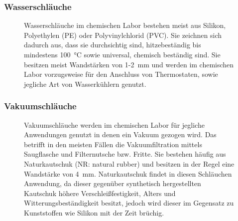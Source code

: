 \subsubsection*{Wasserschläuche}
\begin{figure}[h!]
	\begin{minipage}[t]{0.63\textwidth}
		\vspace{0pt}
		Wasserschläuche im chemischen Labor bestehen meist aus Silikon, Polyethylen (PE) oder Polyvinylchlorid (PVC). Sie zeichnen sich dadurch aus, dass sie durchsichtig sind, hitzebeständig bis mindestens \SI{100}{\celsius} sowie universal, chemisch beständig sind. 
		Sie besitzen meist Wandstärken von 1-\SI{2}{\milli \meter} und werden im chemischen Labor vorzugsweise für den Anschluss von Thermostaten, sowie jegliche Art von Wasserkühlern genutzt.
	\end{minipage}
	\hfill
	\hspace{1mm}
	\begin{minipage}[t]{0.35\textwidth}
	\end{minipage}
\end{figure}
\FloatBarrier
\vspace{-7mm}
\subsubsection*{Vakuumschläuche}
 \begin{figure}[h!]
	\begin{minipage}[t]{0.35\textwidth}
	\end{minipage}
	\hfill
	\hspace{2mm}
	\begin{minipage}[t]{0.65\textwidth}
		\vspace{0pt}
		Vakuumschläuche werden im chemischen Labor für jegliche Anwendungen genutzt in denen ein Vakuum gezogen wird. Das betrifft in den meisten Fällen die Vakuumfiltration mittels Saugflasche und Filternutsche bzw. Fritte. Sie bestehen häufig aus Naturkautschuk (NR: natural rubber) und besitzen in der Regel eine Wandstärke von \SI{4}{\milli \meter}. Naturkautschuk findet in diesen Schläuchen Anwendung, da dieser gegenüber synthetisch hergestellten Kautschuk höhere Verschleißfestigkeit, Alters und Witterungsbeständigkeit besitzt, jedoch wird dieser im Gegensatz zu Kunststoffen wie Silikon mit der Zeit brüchig.
	\end{minipage}
\end{figure}
\FloatBarrier

